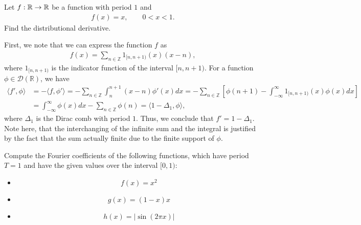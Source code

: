 \documentclass[11pt]{article}
\begin{document}
\begin{exercise}
    Let $f : \mathbb{R} \rightarrow \mathbb{R}$ be a function with period $1$ and 
    \begin{align*}
        f(x) = x, \qquad 0 < x < 1.
    \end{align*}
    Find the distributional derivative. 
\end{exercise}
\begin{solution}
    First, we note that we can express the function $f$ as
    \begin{align*}
        f(x) = \sum_{n \in \mathbb{Z}} 1_{[n, n+1)}(x) (x - n),
    \end{align*}
    where $1_{[n, n+1)}$ is the indicator function of the interval $[n, n+1)$.
    For a function $\phi \in \mathcal{D}(\mathbb{R})$, we have
    \begin{align*}
        \langle f', \phi \rangle &= - \langle f, \phi' \rangle = -\sum_{n \in \mathbb{Z}} \int_n^{n+1} (x - n) \phi'(x) dx = -\sum_{n \in \mathbb{Z}} \left[ \phi(n + 1) - \int_{-\infty}^\infty 1_{[n, n+1)}(x) \phi(x) dx\right]\\
        &= \int_{-\infty}^\infty \phi(x) dx - \sum_{n \in \mathbb{Z}} \phi(n) = \langle 1 - \Delta_1, \phi \rangle,
    \end{align*}
    where $\Delta_1$ is the Dirac comb with period $1$. Thus, we conclude that $f' = 1 - \Delta_1$. Note here, that the interchanging of the infinite sum and the integral is justified by the fact that the sum actually finite due to the finite support of $\phi$.
\end{solution}
\begin{exercise}
    Compute the Fourier coefficients of the following functions, which have period $T = 1$ and have the given values over the interval $[0,1)$:
    \begin{itemize}
     \item 
     \[
        f(x) = x^{2}
     \]
     \item 
     \[
        g(x) = (1-x)x
     \]
     \item 
     \[
        h(x) = |\sin( 2 \pi x )|
     \]
    \end{itemize}
\end{exercise}
\end{document}
